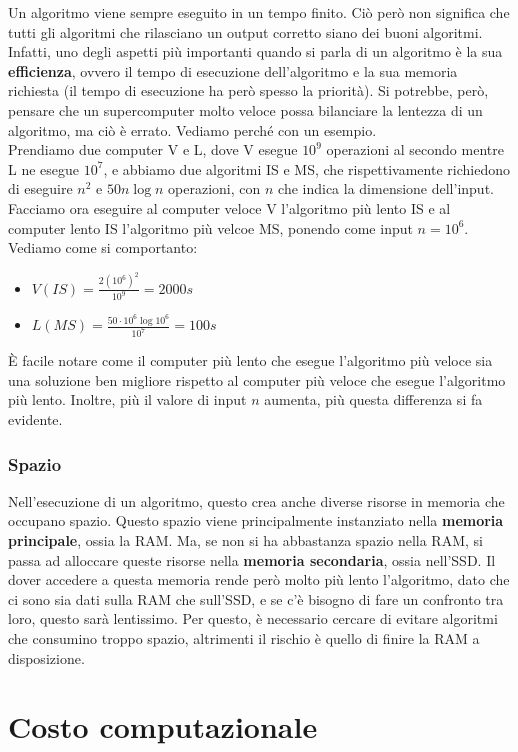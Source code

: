 \documentclass[11pt, a4paper, titlepage, oneside]{scrbook}
\begin{document}
Un algoritmo viene sempre eseguito in un tempo finito. Ciò però non significa che tutti gli algoritmi che rilasciano un output corretto siano dei buoni algoritmi. Infatti, uno degli aspetti più importanti quando si parla di un algoritmo è la sua \textbf{efficienza}, ovvero il tempo di esecuzione dell'algoritmo e la sua memoria richiesta (il tempo di esecuzione ha però spesso la priorità). Si potrebbe, però, pensare che un supercomputer molto veloce possa bilanciare la lentezza di un algoritmo, ma ciò è errato. Vediamo perché con un esempio. \\
Prendiamo due computer V e L, dove V esegue $10^9$ operazioni al secondo mentre L ne esegue $10^7$, e abbiamo due algoritmi IS e MS, che rispettivamente richiedono di eseguire $n^2$ e $50 n \log n$ operazioni, con $n$ che indica la dimensione dell'input. Facciamo ora eseguire al computer veloce V l'algoritmo più lento IS e al computer lento IS l'algoritmo più velcoe MS, ponendo come input $n = 10^6$. Vediamo come si comportanto:
\begin{itemize}
    \item $V(IS) = \frac{2(10^6)^2}{10^9} = 2000s$ 
    \item $L(MS) = \frac{50 \cdot 10^6 \log 10^6}{10^7} = 100s$
\end{itemize}
È facile notare come il computer più lento che esegue l'algoritmo più veloce sia una soluzione ben migliore rispetto al computer più veloce che esegue l'algoritmo più lento. Inoltre, più il valore di input $n$ aumenta, più questa differenza si fa evidente.

\subsection{Spazio}
Nell'esecuzione di un algoritmo, questo crea anche diverse risorse in memoria che occupano spazio. Questo spazio viene principalmente instanziato nella \textbf{memoria principale}, ossia la RAM. Ma, se non si ha abbastanza spazio nella RAM, si passa ad alloccare queste risorse nella \textbf{memoria secondaria}, ossia nell'SSD. Il dover accedere a questa memoria rende però molto più lento l'algoritmo, dato che ci sono sia dati sulla RAM che sull'SSD, e se c'è bisogno di fare un confronto tra loro, questo sarà lentissimo. Per questo, è necessario cercare di evitare algoritmi che consumino troppo spazio, altrimenti il rischio è quello di finire la RAM a disposizione.  

\chapter{Costo computazionale}
\end{document}
